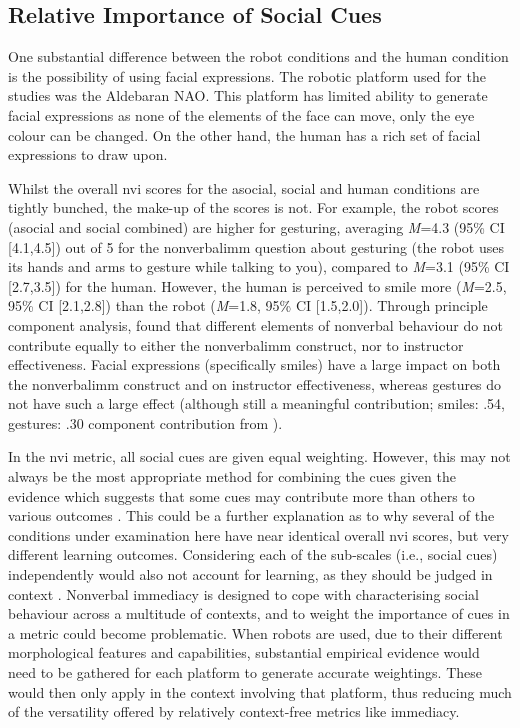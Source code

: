 \subsection{Relative Importance of Social Cues}
One substantial difference between the robot conditions and the human condition is the possibility of using facial expressions. The robotic platform used for the studies was the Aldebaran NAO. This platform has limited ability to generate facial expressions as none of the elements of the face can move, only the eye colour can be changed. On the other hand, the human has a rich set of facial expressions to draw upon.

Whilst the overall \acrshort{nvi} scores for the asocial, social and human conditions are tightly bunched, the make-up of the scores is not. For example, the robot scores (asocial and social combined) are higher for gesturing, averaging \textit{M}=4.3 (95\% CI [4.1,4.5]) out of 5 for the \gls{nonverbalimm} question about gesturing (the robot uses its hands and arms to gesture while talking to you), compared to \textit{M}=3.1 (95\% CI [2.7,3.5]) for the human. However, the human is perceived to smile more (\textit{M}=2.5, 95\% CI [2.1,2.8]) than the robot (\textit{M}=1.8, 95\% CI [1.5,2.0]). Through principle component analysis, \cite{wilson2007immediacy} found that different elements of nonverbal behaviour do not contribute equally to either the \gls{nonverbalimm} construct, nor to instructor effectiveness. Facial expressions (specifically smiles) have a large impact on both the \gls{nonverbalimm} construct and on instructor effectiveness, whereas gestures do not have such a large effect (although still a meaningful contribution; smiles: .54, gestures: .30 component contribution from \citealp{wilson2007immediacy}).

In the \acrshort{nvi} metric, all social cues are given equal weighting. However, this may not always be the most appropriate method for combining the cues given the evidence which suggests that some cues may contribute more than others to various outcomes \citep{mccroskey1996nonverbal, wilson2007immediacy}. This could be a further explanation as to why several of the conditions under examination here have near identical overall \acrshort{nvi} scores, but very different \gls{learning} outcomes. Considering each of the sub-scales (i.e., social cues) independently would also not account for \gls{learning}, as they should be judged in context \citep{zaki2013cue}. Nonverbal immediacy is designed to cope with characterising social behaviour across a multitude of contexts, and to weight the importance of cues in a metric could become problematic. When robots are used, due to their different morphological features and capabilities, substantial empirical evidence would need to be gathered for each platform to generate accurate weightings. These would then only apply in the context involving that platform, thus reducing much of the versatility offered by relatively context-free metrics like immediacy.


